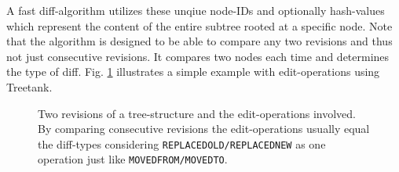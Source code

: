 A fast diff-algorithm utilizes these unqiue node-IDs and optionally hash-values which represent the content of the entire subtree rooted at a specific node. Note that the algorithm is designed to be able to compare any two revisions and thus not just consecutive revisions. It compares two nodes each time and determines the type of diff. Fig. \ref{fig:diff} illustrates a simple example with edit-operations using Treetank.

\begin{figure}[tb]
\caption{\label{fig:diff} Two revisions of a tree-structure and the edit-operations involved. By comparing consecutive revisions the edit-operations usually equal the diff-types considering \texttt{REPLACEDOLD/REPLACEDNEW} as one operation just like \texttt{MOVEDFROM/MOVEDTO}.}
\end{figure} 

